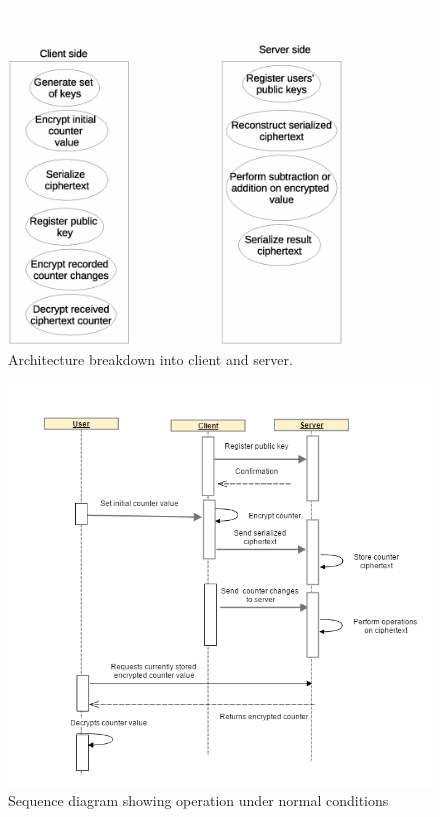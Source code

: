 \begin{figure}[h!]
  \centering 
  \includegraphics[scale=0.7]{clientserver}
  \caption{Architecture breakdown into client and server.}
\end{figure}


\begin{figure}[h!]
  \centering
  \includegraphics[scale=0.7]{counter}
  \caption{Sequence diagram showing operation under normal conditions}
\end{figure}

\clearpage
